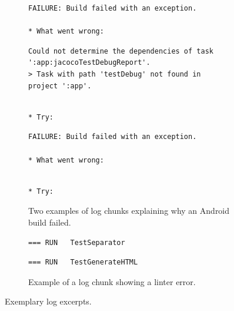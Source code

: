 \lstset{escapeinside=//}
\begin{figure}[tbp]
  \centering
\begin{subfigure}[tbp]{\columnwidth}
  \begin{lstlisting}[breaklines=true,frame=tlr]
FAILURE: Build failed with an exception.

* What went wrong:
  \end{lstlisting}
  \vspace{-\baselineskip}
  \begin{lstlisting}[backgroundcolor=\color{Cerulean!60},breaklines=true,frame=rl]
Could not determine the dependencies of task ':app:jacocoTestDebugReport'.
> Task with path 'testDebug' not found in project ':app'.
  \end{lstlisting}
  \vspace{-\baselineskip}
  \begin{lstlisting}[breaklines=true,frame=blr]

* Try:
  \end{lstlisting}
\end{subfigure}\hspace{\fill}
\begin{subfigure}[tbp]{\columnwidth}
  \centering
  \begin{lstlisting}[breaklines=true,frame=tlr]
FAILURE: Build failed with an exception.

* What went wrong:
  \end{lstlisting}
  \vspace{-\baselineskip}
  
  \vspace{-\baselineskip}
  \begin{lstlisting}[breaklines=true,frame=blr]

* Try:
  \end{lstlisting}
    \caption{Two examples of log chunks explaining why an Android
  build failed.}
  \label{lst:chunk-example}
\end{subfigure}

\begin{subfigure}[tbp]{\columnwidth}
  \begin{lstlisting}[breaklines=true,frame=tlr]
=== RUN   TestSeparator
  \end{lstlisting}
  \vspace{-\baselineskip}
  
  \vspace{-\baselineskip}
  \begin{lstlisting}[breaklines=true,frame=blr]
=== RUN   TestGenerateHTML
  \end{lstlisting}
  \caption{Example of a log chunk showing a linter error.}
  \label{lst:chunk-example-3}
\end{subfigure}

\caption{Exemplary log excerpts.}
\label{lst:logexamples}
\end{figure}

